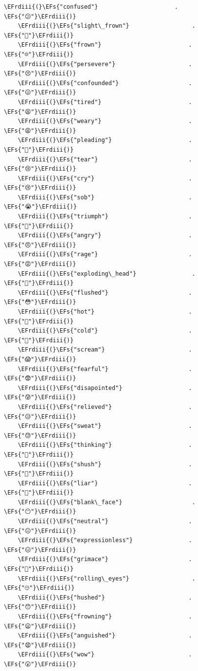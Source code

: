 \documentclass{scrartcl}
\newcommand{\EFs}[1]{\textcolor{EFs}{#1}} %
\newcommand{\EFrdiii}[1]{#1} %
\begin{document}
\begin{Code}
\begin{Verbatim}[]
    \EFrdiii{(}\EFs{"confused"}                      . \EFs{"😕"}\EFrdiii{)}
    \EFrdiii{(}\EFs{"slight\_frown"}                  . \EFs{"🙁"}\EFrdiii{)}
    \EFrdiii{(}\EFs{"frown"}                         . \EFs{"☹️"}\EFrdiii{)}
    \EFrdiii{(}\EFs{"persevere"}                     . \EFs{"😣"}\EFrdiii{)}
    \EFrdiii{(}\EFs{"confounded"}                    . \EFs{"😖"}\EFrdiii{)}
    \EFrdiii{(}\EFs{"tired"}                         . \EFs{"😫"}\EFrdiii{)}
    \EFrdiii{(}\EFs{"weary"}                         . \EFs{"😩"}\EFrdiii{)}
    \EFrdiii{(}\EFs{"pleading"}                      . \EFs{"🥺"}\EFrdiii{)}
    \EFrdiii{(}\EFs{"tear"}                          . \EFs{"😢"}\EFrdiii{)}
    \EFrdiii{(}\EFs{"cry"}                           . \EFs{"😢"}\EFrdiii{)}
    \EFrdiii{(}\EFs{"sob"}                           . \EFs{"😭"}\EFrdiii{)}
    \EFrdiii{(}\EFs{"triumph"}                       . \EFs{"😤"}\EFrdiii{)}
    \EFrdiii{(}\EFs{"angry"}                         . \EFs{"😠"}\EFrdiii{)}
    \EFrdiii{(}\EFs{"rage"}                          . \EFs{"😡"}\EFrdiii{)}
    \EFrdiii{(}\EFs{"exploding\_head"}                . \EFs{"🤯"}\EFrdiii{)}
    \EFrdiii{(}\EFs{"flushed"}                       . \EFs{"😳"}\EFrdiii{)}
    \EFrdiii{(}\EFs{"hot"}                           . \EFs{"🥵"}\EFrdiii{)}
    \EFrdiii{(}\EFs{"cold"}                          . \EFs{"🥶"}\EFrdiii{)}
    \EFrdiii{(}\EFs{"scream"}                        . \EFs{"😱"}\EFrdiii{)}
    \EFrdiii{(}\EFs{"fearful"}                       . \EFs{"😨"}\EFrdiii{)}
    \EFrdiii{(}\EFs{"disapointed"}                   . \EFs{"😰"}\EFrdiii{)}
    \EFrdiii{(}\EFs{"relieved"}                      . \EFs{"😥"}\EFrdiii{)}
    \EFrdiii{(}\EFs{"sweat"}                         . \EFs{"😓"}\EFrdiii{)}
    \EFrdiii{(}\EFs{"thinking"}                      . \EFs{"🤔"}\EFrdiii{)}
    \EFrdiii{(}\EFs{"shush"}                         . \EFs{"🤫"}\EFrdiii{)}
    \EFrdiii{(}\EFs{"liar"}                          . \EFs{"🤥"}\EFrdiii{)}
    \EFrdiii{(}\EFs{"blank\_face"}                    . \EFs{"😶"}\EFrdiii{)}
    \EFrdiii{(}\EFs{"neutral"}                       . \EFs{"😐"}\EFrdiii{)}
    \EFrdiii{(}\EFs{"expressionless"}                . \EFs{"😑"}\EFrdiii{)}
    \EFrdiii{(}\EFs{"grimace"}                       . \EFs{"😬"}\EFrdiii{)}
    \EFrdiii{(}\EFs{"rolling\_eyes"}                  . \EFs{"🙄"}\EFrdiii{)}
    \EFrdiii{(}\EFs{"hushed"}                        . \EFs{"😯"}\EFrdiii{)}
    \EFrdiii{(}\EFs{"frowning"}                      . \EFs{"😦"}\EFrdiii{)}
    \EFrdiii{(}\EFs{"anguished"}                     . \EFs{"😧"}\EFrdiii{)}
    \EFrdiii{(}\EFs{"wow"}                           . \EFs{"😮"}\EFrdiii{)}

\end{Verbatim}
\end{Code}
\end{document}
